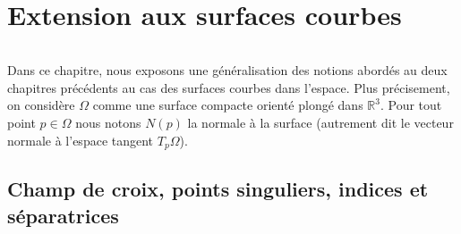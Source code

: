 \chapter{Extension aux surfaces courbes}
\label{chap:surface_courbe}
\minitoc

\[\]

Dans ce chapitre, nous exposons une généralisation des notions abordés au deux chapitres précédents au cas des surfaces courbes dans l'espace. Plus précisement, on considère $\Omega$ comme une surface compacte orienté plongé dans $\mathbb{R}^3$. Pour tout point $p\in\Omega$ nous notons $N(p)$ la normale à la surface (autrement dit le vecteur normale à l'espace tangent $T_p\Omega$).

\section{Champ de croix, points singuliers, indices et séparatrices}

